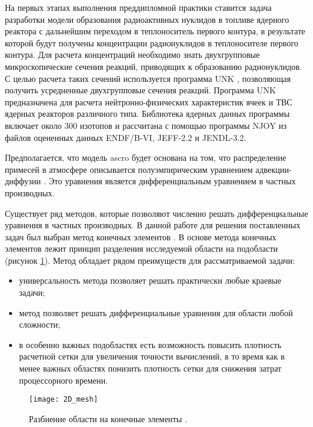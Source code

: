 На первых этапах выполнения преддипломной практики ставится задача разработки модели образования радиоактивных нуклидов 
в топливе ядерного реактора с дальнейшим переходом в теплоноситель первого контура, в результате которой будут получены 
концентрации радионуклидов в теплоносителе первого контура. Для расчета концентраций необходимо знать двухгрупповые 
микроскопические сечения реакций, приводящих к образованию радионуклидов. С целью расчета таких сечений используется 
программа UNK \cite{unk}, позволяющая получить усредненные двухгрупповые сечения реакций. Программа UNK предназначена 
для расчета нейтронно-физических характеристик ячеек и ТВС ядерных реакторов различного типа. Библиотека ядерных данных 
программы включает около 300 изотопов и рассчитана с помощью программы NJOY из файлов оцененных данных ENDF/B-VI, 
JEFF-2.2 и JENDL-3.2.

Предполагается, что модель \ac{ascro} будет основана на том, что распределение примесей в атмосфере описывается 
полуэмпирическим уравнением адвекции-диффузии \cite{elokhin}. Это уравнения является дифференциальным уравнением в 
частных производных. 

Существует ряд методов, которые позволяют численно решать дифференциальные уравнения в частных производных. В данной 
работе для решения поставленных задач был выбран метод конечных элементов \cite{mke}. В основе метода конечных 
элементов лежит принцип разделения исследуемой области на подобласти (рисунок \ref{fig_mesh}). Метод обладает рядом 
преимуществ для рассматриваемой задачи:

\begin{itemize}
	\item универсальность метода позволяет решать практически любые краевые задачи;
	\item метод позволяет решать дифференциальные уравнения для области любой сложности;
	\item в особенно важных подобластях есть возможность повысить плотность расчетной сетки для увеличения точности 
		вычислений, в то время как в менее важных областях понизить плотность сетки для снижения затрат процессорного 
		времени. 
\end{itemize}

\begin{figure}[ht]
\centering
	\texttt{[image: 2D\_mesh]}
	\captionsetup{justification=centering}
    \caption{Разбиение области на конечные элементы \cite{wiki_mke_fig}.}
    \label{fig_mesh}
\end{figure}


